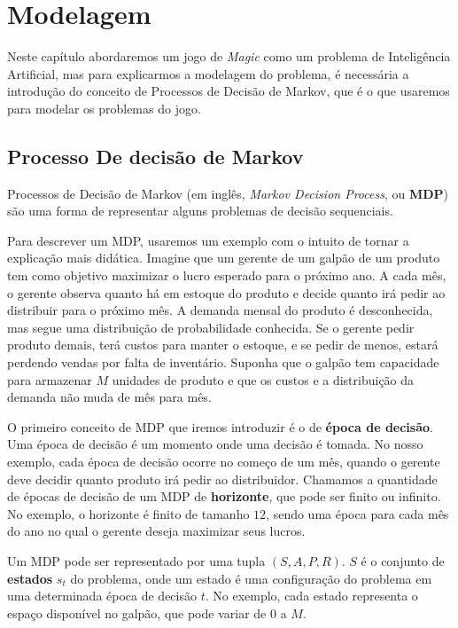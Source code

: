 \chapter{Modelagem}

Neste capítulo abordaremos um jogo de \textit{Magic} como um problema de Inteligência Artificial,
mas para explicarmos a modelagem do problema, é necessária a introdução do conceito de Processos
de Decisão de Markov, que é o que usaremos para modelar os problemas do jogo.

\section{Processo De decisão de Markov}
\label{ssec:mdp}

Processos de Decisão de Markov (em inglês, \textit{Markov Decision Process}, ou \textbf{MDP})
são uma forma de representar alguns problemas de decisão sequenciais.

Para descrever um MDP, usaremos um exemplo com o intuito de tornar a explicação mais didática.
Imagine que um gerente de um galpão de um produto tem como objetivo maximizar o lucro esperado
para o próximo ano. A cada mês, o gerente observa quanto há em estoque do produto e decide
quanto irá pedir ao distribuir para o próximo mês. A demanda mensal do produto é desconhecida,
mas segue uma distribuição de probabilidade conhecida. Se o gerente pedir produto demais, terá
custos para manter o estoque, e se pedir de menos, estará perdendo vendas por falta de inventário.
Suponha que o galpão tem capacidade para armazenar $M$ unidades de produto e que os custos e a
distribuição da demanda não muda de mês para mês.

O primeiro conceito de MDP que iremos introduzir é o de \textbf{época de decisão}. Uma época de
decisão é um momento onde uma decisão é tomada. No nosso exemplo, cada época de decisão ocorre
no começo de um mês, quando o gerente deve decidir quanto produto irá pedir ao distribuidor. Chamamos
a quantidade de épocas de decisão de um MDP de \textbf{horizonte}, que pode ser finito ou infinito.
No exemplo, o horizonte é finito de tamanho $12$, sendo uma época para cada mês do ano no qual o
gerente deseja maximizar seus lucros.

Um MDP pode ser representado por uma tupla $(S, A, P, R)$. $S$ é o conjunto de \textbf{estados}
$s_t$ do problema, onde um estado é uma configuração do problema em uma determinada época de
decisão $t$. No exemplo, cada estado representa o espaço disponível no galpão, que pode variar
de $0$ a $M$.

